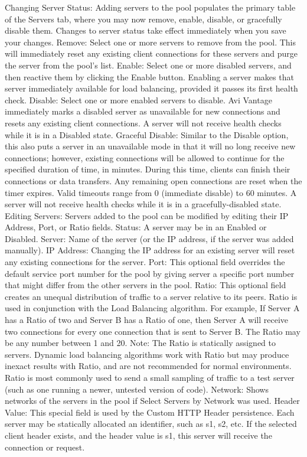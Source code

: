 \documentclass[letterpaper,10pt,english]{sphinxmanual}
\begin{document}
Changing Server Status: Adding servers to the pool populates the primary table of the Servers tab, where you may now remove, enable, disable, or gracefully disable them. Changes to server status take effect immediately when you save your changes.
Remove: Select one or more servers to remove from the pool. This will immediately reset any existing client connections for these servers and purge the server from the pool’s list.
Enable: Select one or more disabled servers, and then reactive them by clicking the Enable button. Enabling a server makes that server immediately available for load balancing, provided it passes its first health check.
Disable: Select one or more enabled servers to disable. Avi Vantage immediately marks a disabled server as unavailable for new connections and resets any existing client connections. A server will not receive health checks while it is in a Disabled state.
Graceful Disable: Similar to the Disable option, this also puts a server in an unavailable mode in that it will no long receive new connections; however, existing connections will be allowed to continue for the specified duration of time, in minutes. During this time, clients can finish their connections or data transfers. Any remaining open connections are reset when the timer expires. Valid timeouts range from 0 (immediate disable) to 60 minutes. A server will not receive health checks while it is in a gracefully-disabled state.
Editing Servers: Servers added to the pool can be modified by editing their IP Address, Port, or Ratio fields.
Status: A server may be in an Enabled or Disabled.
Server: Name of the server (or the IP address, if the server was added manually).
IP Address: Changing the IP address for an existing server will reset any existing connections for the server.
Port: This optional field overrides the default service port number for the pool by giving server a specific port number that might differ from the other servers in the pool.
Ratio: This optional field creates an unequal distribution of traffic to a server relative to its peers. Ratio is used in conjunction with the Load Balancing algorithm. For example, If Server A has a Ratio of two and Server B has a Ratio of one, then Server A will receive two connections for every one connection that is sent to Server B. The Ratio may be any number between 1 and 20.
Note: The Ratio is statically assigned to servers. Dynamic load balancing algorithms work with Ratio but may produce inexact results with Ratio, and are not recommended for normal environments. Ratio is most commonly used to send a small sampling of traffic to a test server (such as one running a newer, untested version of code).
Network: Shows networks of the servers in the pool if Select Servers by Network was used.
Header Value: This special field is used by the Custom HTTP Header persistence. Each server may be statically allocated an identifier, such as s1, s2, etc. If the selected client header exists, and the header value is s1, this server will receive the connection or request.
\end{document}
